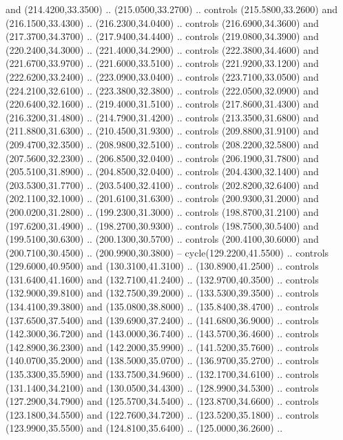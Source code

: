 {\begin{scope}[y=0.80pt, x=0.80pt, yscale=-1, xscale=1, inner sep=0pt, outer sep=0pt, #1]
      and (214.4200,33.3500) .. (215.0500,33.2700) .. controls (215.5800,33.2600)
      and (216.1500,33.4300) .. (216.2300,34.0400) .. controls (216.6900,34.3600)
      and (217.3700,34.3700) .. (217.9400,34.4400) .. controls (219.0800,34.3900)
      and (220.2400,34.3000) .. (221.4000,34.2900) .. controls (222.3800,34.4600)
      and (221.6700,33.9700) .. (221.6000,33.5100) .. controls (221.9200,33.1200)
      and (222.6200,33.2400) .. (223.0900,33.0400) .. controls (223.7100,33.0500)
      and (224.2100,32.6100) .. (223.3800,32.3800) .. controls (222.0500,32.0900)
      and (220.6400,32.1600) .. (219.4000,31.5100) .. controls (217.8600,31.4300)
      and (216.3200,31.4800) .. (214.7900,31.4200) .. controls (213.3500,31.6800)
      and (211.8800,31.6300) .. (210.4500,31.9300) .. controls (209.8800,31.9100)
      and (209.4700,32.3500) .. (208.9800,32.5100) .. controls (208.2200,32.5800)
      and (207.5600,32.2300) .. (206.8500,32.0400) .. controls (206.1900,31.7800)
      and (205.5100,31.8900) .. (204.8500,32.0400) .. controls (204.4300,32.1400)
      and (203.5300,31.7700) .. (203.5400,32.4100) .. controls (202.8200,32.6400)
      and (202.1100,32.1000) .. (201.6100,31.6300) .. controls (200.9300,31.2000)
      and (200.0200,31.2800) .. (199.2300,31.3000) .. controls (198.8700,31.2100)
      and (197.6200,31.4900) .. (198.2700,30.9300) .. controls (198.7500,30.5400)
      and (199.5100,30.6300) .. (200.1300,30.5700) .. controls (200.4100,30.6000)
      and (200.7100,30.4500) .. (200.9900,30.3800) -- cycle(129.2200,41.5500) ..
      controls (129.6000,40.9500) and (130.3100,41.3100) .. (130.8900,41.2500) ..
      controls (131.6400,41.1600) and (132.7100,41.2400) .. (132.9700,40.3500) ..
      controls (132.9000,39.8100) and (132.7500,39.2000) .. (133.5300,39.3500) ..
      controls (134.4100,39.3800) and (135.0800,38.8000) .. (135.8400,38.4700) ..
      controls (137.6500,37.5400) and (139.6900,37.2400) .. (141.6800,36.9000) ..
      controls (142.3000,36.7200) and (143.0000,36.7400) .. (143.5700,36.4600) ..
      controls (142.8900,36.2300) and (142.2000,35.9900) .. (141.5200,35.7600) ..
      controls (140.0700,35.2000) and (138.5000,35.0700) .. (136.9700,35.2700) ..
      controls (135.3300,35.5900) and (133.7500,34.9600) .. (132.1700,34.6100) ..
      controls (131.1400,34.2100) and (130.0500,34.4300) .. (128.9900,34.5300) ..
      controls (127.2900,34.7900) and (125.5700,34.5400) .. (123.8700,34.6600) ..
      controls (123.1800,34.5500) and (122.7600,34.7200) .. (123.5200,35.1800) ..
      controls (123.9900,35.5500) and (124.8100,35.6400) .. (125.0000,36.2600) ..

\end{scope}}
